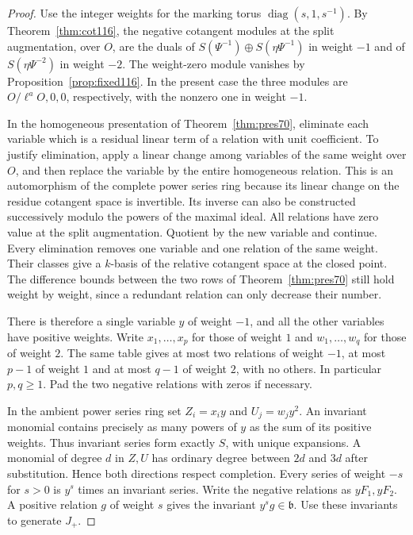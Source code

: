 \documentclass[a4paper,11pt]{article}
\theoremstyle{definition}
\theoremstyle{remark}
\numberwithin{equation}{section}
\begin{document}
\begin{proof}
Use the integer weights for the marking torus
\(\operatorname{diag}(s,1,s^{-1})\). By
Theorem~\ref{thm:cot116}, the negative cotangent modules at the
split augmentation, over \(O\), are the duals of
\(S(\Psi^{-1})\oplus S(\eta\Psi^{-1})\) in weight \(-1\)
and of \(S(\eta\Psi^{-2})\) in weight \(-2\).
The weight-zero module vanishes by
Proposition~\ref{prop:fixed116}. In the present case the
three modules are \(O/\ell^aO,0,0\), respectively, with the
nonzero one in weight \(-1\).

In the homogeneous presentation of Theorem~\ref{thm:pres70},
eliminate each variable which is a residual linear term of
a relation with unit coefficient. To justify elimination,
apply a linear change among variables of the same weight
over \(O\), and then replace the variable by the entire
homogeneous relation. This is an automorphism of the complete
power series ring because its linear change on the residue
cotangent space is invertible. Its inverse can also be
constructed successively modulo the powers of the maximal
ideal. All relations have zero value at the split augmentation.
Quotient by the new variable and continue. Every elimination
removes one variable and one relation of the same weight.
Their classes give a \(k\)-basis of the relative cotangent
space at the closed point. The difference bounds between
the two rows of Theorem~\ref{thm:pres70} still hold weight by
weight, since a redundant relation can only decrease their
number.

There is therefore a single variable \(y\) of weight \(-1\),
and all the other variables have positive weights. Write
\(x_1,\ldots,x_p\) for those of weight \(1\) and
\(w_1,\ldots,w_q\) for those of weight \(2\).
The same table gives at most two relations of weight \(-1\),
at most \(p-1\) of weight \(1\) and at most \(q-1\) of
weight \(2\), with no others. In particular \(p,q\ge1\).
Pad the two negative relations with zeros if necessary.

In the ambient power series ring set \(Z_i=x_i y\) and
\(U_j=w_jy^2\). An invariant monomial contains precisely as
many powers of \(y\) as the sum of its positive weights.
Thus invariant series form exactly \(S\), with unique
expansions. A monomial of degree \(d\) in \(Z,U\) has
ordinary degree between \(2d\) and \(3d\) after substitution.
Hence both directions respect completion. Every series of weight \(-s\) for \(s>0\)
is \(y^s\) times an invariant series. Write the negative
relations as \(yF_1,yF_2\). A positive relation \(g\) of
weight \(s\) gives the invariant \(y^s g\in\mathfrak b\).
Use these invariants to generate \(J_+\).


\end{proof}
\end{document}
